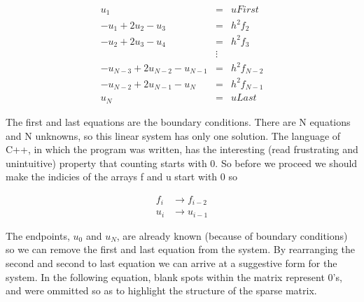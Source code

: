 \documentclass{article}
\begin{document}
\begin{equation} 
\begin{aligned}
                            u_1 &=& uFirst      \\
            - u_1 + 2 u_2 - u_3 &=& h^2 f_2     \\
            - u_2 + 2 u_3 - u_4 &=& h^2 f_3     \\
                             &\vdots &          \\
- u_{N-3} + 2 u_{N-2} - u_{N-1} &=& h^2 f_{N-2} \\
    - u_{N-2} + 2 u_{N-1} - u_N &=& h^2 f_{N-1} \\
                            u_N &=& uLast
\end{aligned} 
\end{equation}

The first and last equations are the boundary conditions.  There are N equations and N unknowns, so this linear system has only one solution.  The language of C++, in which the program was written, has the interesting (read frustrating and unintuitive) property that counting starts with 0.  So before we proceed we should make the indicies of the arrays f and u start with 0 so

\begin{equation}
\begin{aligned}
	f_i &\to f_{i-2} \\
	u_i &\to u_{i-1}
\end{aligned}
\end{equation}


The endpoints, $u_0$ and $u_N$, are already known (because of boundary conditions) so we can remove the first and last equation from the system.  By rearranging the second and second to last equation we can arrive at a suggestive form for the system.  In the following equation, blank spots within the matrix represent 0's, and were ommitted so as to highlight the structure of the sparse matrix.
\end{document}
